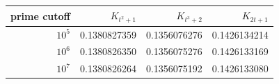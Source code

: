 \begin{tabular}{@{}rrrr@{}}
\toprule
prime cutoff & $K_{t^2+1}$ & $K_{t^3+2}$ & $K_{2t+1}$ \\
\midrule
$10^{5}$ & 0.1380827359 & 0.1356076276 & 0.1426134214 \\
$10^{6}$ & 0.1380826350 & 0.1356075276 & 0.1426133169 \\
$10^{7}$ & 0.1380826264 & 0.1356075192 & 0.1426133080 \\
\bottomrule
\end{tabular}
